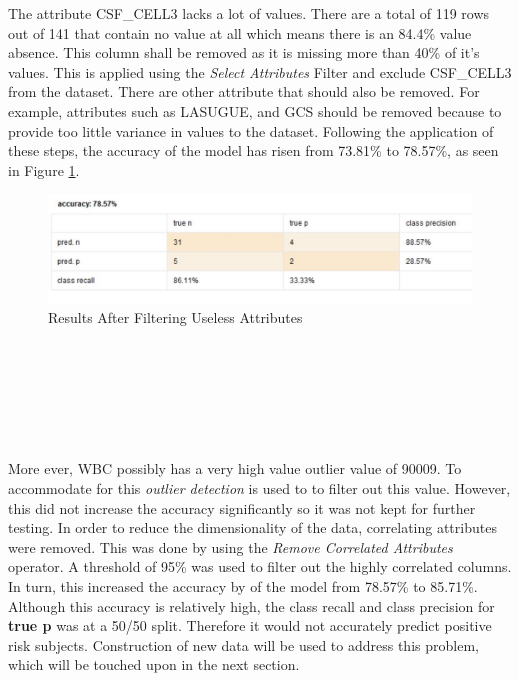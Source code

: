 The attribute CSF\_CELL3 lacks a lot of values. There are a total of 119 rows out of 141 that contain no value at all which means there is an  84.4\% value absence. This column shall be removed as it is missing more than 40\% of it's values. This is applied using the \textit{Select Attributes} Filter and exclude CSF\_CELL3 from the dataset. There are other attribute that should also be removed. For example, attributes such as LASUGUE, and GCS should be removed because to provide too little variance in values to the dataset. Following the application of these steps, the accuracy of the model has risen from 73.81\% to 78.57\%, as seen in Figure \ref{filtering}. \\ 
\begin{figure}[ht]
	\begin{center}
		\advance\leftskip-3cm
		\advance\rightskip-3cm
		\includegraphics[keepaspectratio=true,scale=0.6]{__resources/gcsfilter.jpg}
		\caption{Results After Filtering Useless Attributes}
		\label{filtering}
	\end{center}
\end{figure}
\\\\\\\\\\\\
More ever, WBC possibly has a very high value outlier value of 90009. To accommodate for this \textit{outlier detection} is used to to filter out this value. However, this did not increase the accuracy significantly so it was not kept for further testing. 
In order to reduce the dimensionality of the data, correlating attributes were removed. This was done by using the \textit{Remove Correlated Attributes} operator. A threshold of 95\% was used to filter out the highly correlated columns. In turn, this increased the accuracy by of the model from 78.57\% to 85.71\%. Although this accuracy is relatively high, the class recall and class precision for \textbf{true p} was at a 50/50 split. Therefore it would not accurately predict positive risk subjects. Construction of new data will be used to address this problem, which will be touched upon in the next section.


